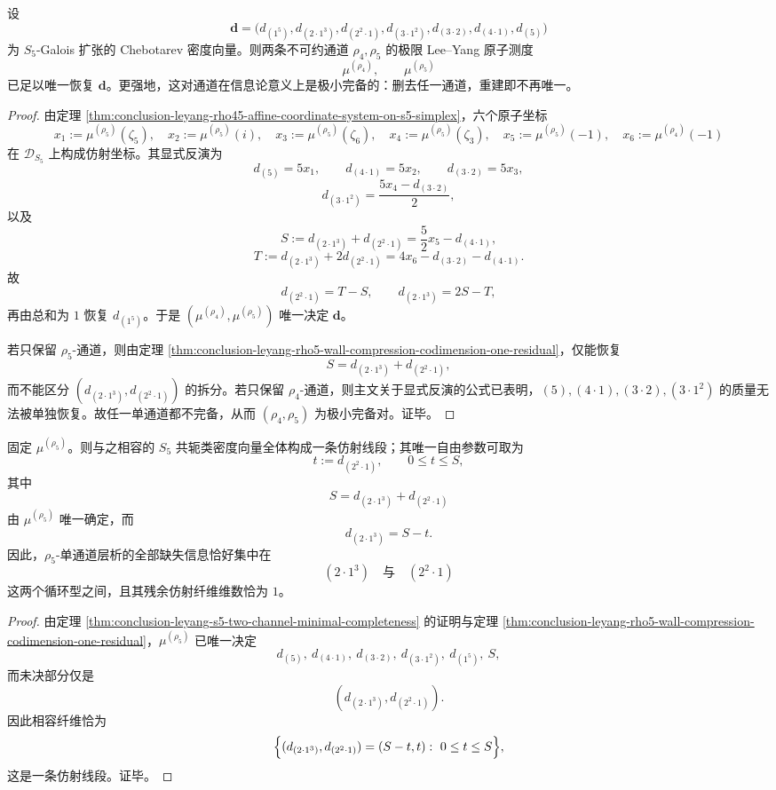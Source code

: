 \begin{theorem}\label{thm:conclusion-leyang-s5-two-channel-minimal-completeness}
设
\[
\mathbf d=
\bigl(
d_{(1^5)},d_{(2\cdot1^3)},d_{(2^2\cdot1)},d_{(3\cdot1^2)},d_{(3\cdot2)},d_{(4\cdot1)},d_{(5)}
\bigr)
\]
为 \(S_5\)-Galois 扩张的 Chebotarev 密度向量。则两条不可约通道 \(\rho_4,\rho_5\) 的极限 Lee--Yang 原子测度
\[
\mu^{(\rho_4)},\qquad \mu^{(\rho_5)}
\]
已足以唯一恢复 \(\mathbf d\)。更强地，这对通道在信息论意义上是极小完备的：删去任一通道，重建即不再唯一。
\end{theorem}
\begin{proof}
由定理 \ref{thm:conclusion-leyang-rho45-affine-coordinate-system-on-s5-simplex}，六个原子坐标
\[
x_1:=\mu^{(\rho_5)}(\zeta_5),\quad
x_2:=\mu^{(\rho_5)}(i),\quad
x_3:=\mu^{(\rho_5)}(\zeta_6),\quad
x_4:=\mu^{(\rho_5)}(\zeta_3),\quad
x_5:=\mu^{(\rho_5)}(-1),\quad
x_6:=\mu^{(\rho_4)}(-1)
\]
在 \(\mathcal D_{S_5}\) 上构成仿射坐标。其显式反演为
\[
d_{(5)}=5x_1,\qquad
d_{(4\cdot1)}=5x_2,\qquad
d_{(3\cdot2)}=5x_3,
\]
\[
d_{(3\cdot1^2)}=\frac{5x_4-d_{(3\cdot2)}}{2},
\]
以及
\[
S:=d_{(2\cdot1^3)}+d_{(2^2\cdot1)}=\frac52x_5-d_{(4\cdot1)},
\]
\[
T:=d_{(2\cdot1^3)}+2d_{(2^2\cdot1)}=4x_6-d_{(3\cdot2)}-d_{(4\cdot1)}.
\]
故
\[
d_{(2^2\cdot1)}=T-S,\qquad
d_{(2\cdot1^3)}=2S-T,
\]
再由总和为 \(1\) 恢复 \(d_{(1^5)}\)。于是 \((\mu^{(\rho_4)},\mu^{(\rho_5)})\) 唯一决定 \(\mathbf d\)。

若只保留 \(\rho_5\)-通道，则由定理 \ref{thm:conclusion-leyang-rho5-wall-compression-codimension-one-residual}，仅能恢复
\[
S=d_{(2\cdot1^3)}+d_{(2^2\cdot1)},
\]
而不能区分 \((d_{(2\cdot1^3)},d_{(2^2\cdot1)})\) 的拆分。若只保留 \(\rho_4\)-通道，则主文关于显式反演的公式已表明，\((5),(4\cdot1),(3\cdot2),(3\cdot1^2)\) 的质量无法被单独恢复。故任一单通道都不完备，从而 \((\rho_4,\rho_5)\) 为极小完备对。证毕。
\end{proof}

\begin{corollary}\label{cor:conclusion-leyang-rho5-single-channel-codim-one-fiber}
固定 \(\mu^{(\rho_5)}\)。则与之相容的 \(S_5\) 共轭类密度向量全体构成一条仿射线段；其唯一自由参数可取为
\[
t:=d_{(2^2\cdot1)},
\qquad
0\le t\le S,
\]
其中
\[
S=d_{(2\cdot1^3)}+d_{(2^2\cdot1)}
\]
由 \(\mu^{(\rho_5)}\) 唯一确定，而
\[
d_{(2\cdot1^3)}=S-t.
\]
因此，\(\rho_5\)-单通道层析的全部缺失信息恰好集中在
\[
(2\cdot1^3)\quad\text{与}\quad (2^2\cdot1)
\]
这两个循环型之间，且其残余仿射纤维维数恰为 \(1\)。
\end{corollary}
\begin{proof}
由定理 \ref{thm:conclusion-leyang-s5-two-channel-minimal-completeness} 的证明与定理 \ref{thm:conclusion-leyang-rho5-wall-compression-codimension-one-residual}，\(\mu^{(\rho_5)}\) 已唯一决定
\[
d_{(5)},\ d_{(4\cdot1)},\ d_{(3\cdot2)},\ d_{(3\cdot1^2)},\ d_{(1^5)},\ S,
\]
而未决部分仅是
\[
(d_{(2\cdot1^3)},d_{(2^2\cdot1)}).
\]
因此相容纤维恰为
\[
\Bigl\{(d_{(2\cdot1^3)},d_{(2^2\cdot1)})=(S-t,t):\ 0\le t\le S\Bigr\},
\]
这是一条仿射线段。证毕。
\end{proof}

